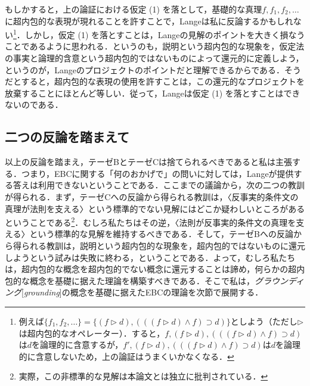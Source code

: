 \documentclass[dvipdfmx,twoside,11pt,uplatex]{jsarticle}
\newcommand{\myterm}[2]{{\emph{#1}}{[\emph{#2}]}}
\theoremstyle{definition}
\begin{document}
もしかすると，上の論証における仮定 (1) を落として，基礎的な真理$f, f_1, f_2, \ldots$に超内包的な表現が現れることを許すことで，Langeは私に反論するかもしれない\footnote{
例えば$\{f_1, f_2, \ldots\}=\{(f\triangleright d), (((f\triangleright d)\land f)\supset d)\}$としよう（ただし$\triangleright$は超内包的なオペレーター）．すると，$f, (f\triangleright d), (((f\triangleright d)\land f)\supset d)$は$d$を論理的に含意するが，$f', (f\triangleright d), (((f\triangleright d)\land f)\supset d)$は$d$を論理的に含意しないため，上の論証はうまくいかなくなる．
}．しかし，仮定 (1) を落とすことは，Langeの見解のポイントを大きく損なうことであるように思われる．というのも，説明という超内包的な現象を，仮定法の事実と論理的含意という超内包的ではないものによって還元的に定義しよう，というのが，Langeのプロジェクトのポイントだと理解できるからである．そうだとすると，超内包的な表現の使用を許すことは，この還元的なプロジェクトを放棄することにほとんど等しい．従って，Langeは仮定 (1) を落とすことはできないのである．


\subsection{二つの反論を踏まえて}\label{consideration}
以上の反論を踏まえ，テーゼBとテーゼCは捨てられるべきであると私は主張する．つまり，EBCに関する「何のおかげで」の問いに対しては，Langeが提供する答えは利用できないということである．ここまでの議論から，次の二つの教訓が得られる．まず，テーゼCへの反論から得られる教訓は，〈反事実的条件文の真理が法則を支える〉という標準的でない見解にはどこか疑わしいところがあるということである\footnote{
実際，この非標準的な見解は本論文とは独立に批判されている\citep{Demarest2012counter,woodwardetal2011lange}．
}．むしろ私たちはその逆，〈法則が反事実的条件文の真理を支える〉という標準的な見解を維持するべきである．そして，テーゼBへの反論から得られる教訓は，説明という超内包的な現象を，超内包的ではないものに還元しようという試みは失敗に終わる，ということである．よって，むしろ私たちは，超内包的な概念を超内包的でない概念に還元することは諦め，何らかの超内包的な概念を基礎に据えた理論を構築すべきである．そこで私は，\myterm{グラウンディング}{grounding}の概念を基礎に据えたEBCの理論を次節で展開する．
\end{document}
